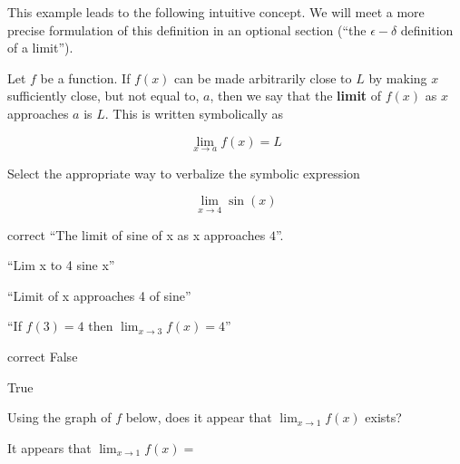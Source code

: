 \documentclass{ximera}
\begin{document}
This example leads to the following intuitive concept.  We will meet a more precise formulation of this definition in an optional section (``the $\epsilon - \delta$ definition of a limit'').

\begin{definition}
Let $f$ be a function.  If $f(x)$ can be made arbitrarily close to $L$ by making $x$ sufficiently close, but not equal to, $a$, then we say that the \textbf{limit} of $f(x)$ as $x$ approaches $a$ is $L$.  This is written symbolically as

\[
\lim_{x\to a} f(x) = L
\]
\end{definition}

\begin{question}

Select the appropriate way to verbalize the symbolic expression 

\[
\lim_{x \to 4} \sin(x)
\]

\begin{multiple-choice}
\item[correct] ``The limit of sine of x as x approaches $4$''.
\item ``Lim x to 4 sine x''
\item ``Limit of x approaches 4 of sine''
\end{multiple-choice}
\end{question}

\begin{question}
``If $f(3) = 4$ then $\displaystyle \lim_{x \to 3} f(x) = 4$''

\begin{multiple-choice}
\item[correct] False
\item True
\end{multiple-choice}

\end{question}

\begin{question}
Using the graph of $f$ below, does it appear that $\lim_{x \to 1} f(x)$ exists?  


\begin{multiple-choice}
\end{multiple-choice}


\begin{question}
	It appears that $\lim_{x\to 1} f(x) = $  
\end{question}


\end{question}
\end{document}
